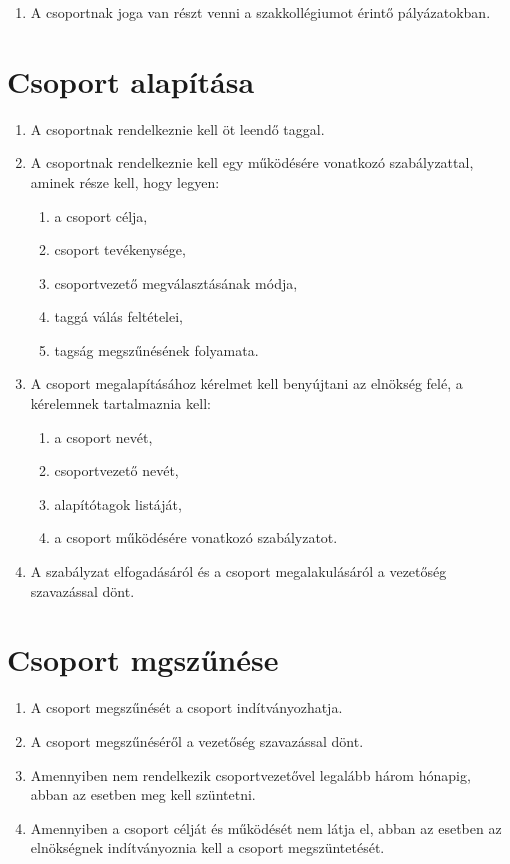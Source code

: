 \documentclass[12pt]{report}
\begin{document}
\begin{enumerate}
  \item A csoportnak joga van részt venni a szakkollégiumot érintő pályázatokban.
\end{enumerate}

\section{Csoport alapítása}

\begin{enumerate}
  \item A csoportnak rendelkeznie kell öt leendő taggal.

  \item A csoportnak rendelkeznie kell egy működésére vonatkozó szabályzattal, aminek része kell, hogy legyen:
  \begin{enumerate}
    \item a csoport célja,
    \item csoport tevékenysége,
    \item csoportvezető megválasztásának módja,
    \item taggá válás feltételei,
    \item tagság megszűnésének folyamata.
  \end{enumerate}

  \item A csoport megalapításához kérelmet kell benyújtani az elnökség felé, a kérelemnek tartalmaznia kell:
  \begin{enumerate}
    \item a csoport nevét,
    \item csoportvezető nevét,
    \item alapítótagok listáját,
    \item a csoport működésére vonatkozó szabályzatot.
  \end{enumerate}
  \item A szabályzat elfogadásáról és a csoport megalakulásáról a vezetőség szavazással dönt.
\end{enumerate}

\section{Csoport mgszűnése}

\begin{enumerate}
  \item A csoport megszűnését a csoport indítványozhatja.
  \item A csoport megszűnéséről a vezetőség szavazással dönt.
  \item Amennyiben nem rendelkezik csoportvezetővel legalább három hónapig, abban az esetben meg kell szüntetni.
  \item Amennyiben a csoport célját és működését nem látja el, abban az esetben az elnökségnek indítványoznia kell a csoport megszüntetését.
\end{enumerate}
\end{document}
